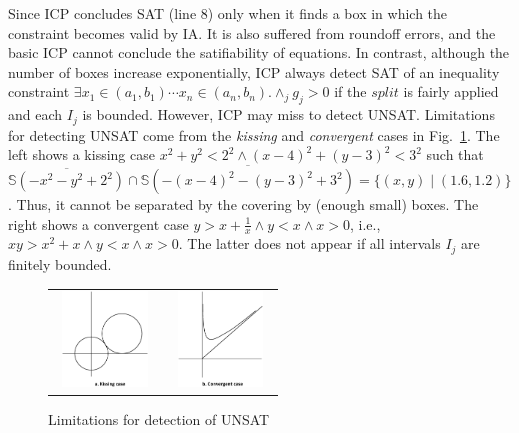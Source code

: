 \documentclass[runningheads,a4paper,oribibl]{llncs}
\begin{document}
Since ICP concludes SAT (line 8) only when it finds a box in which the constraint
becomes valid by IA. It is also suffered from roundoff errors, and 
the basic ICP cannot conclude the satifiability of equations. 
In contrast, although the number of boxes increase exponentially,
ICP always detect SAT of an inequality constraint 
$\exists x_1 \in (a_1,b_1) \cdots x_n \in (a_n,b_n) . \wedge_{j} g_j > 0$
if the $split$ is fairly applied and each $I_j$ is bounded. 
However, ICP may miss to detect UNSAT.
Limitations for detecting UNSAT come from the \emph{kissing} and \emph{convergent} cases
in Fig.~\ref{fig:limit}.  The left shows a kissing case 
$x^2 + y^2 < 2^2 \wedge (x-4)^2 + (y-3)^2 < 3^2$ such that 
$\overline{\mathbb{S}(- x^2 - y^2 + 2^2)} \cap
 \overline{\mathbb{S}(- (x-4)^2 - (y-3)^2 + 3^2)} = \{(x,y) \mid (1.6, 1.2)\}$. 
Thus, it cannot be separated by the covering by (enough small) boxes. 
The right shows a convergent case 
$y > x + \frac{1}{x} \wedge y < x \wedge x > 0$,
i.e., $xy > x^2 + x \wedge y < x \wedge x > 0$.
The latter does not appear if all intervals $I_j$ are finitely bounded. 
\begin{figure}[ht]
\centering
\begin{tabular}{cc}
\includegraphics[height=1in,width=1.05in]{kissing.eps} &
\includegraphics[height=1in,width=1.05in]{convergence.eps}
\end{tabular}
\caption{Limitations for detection of UNSAT} 
\label{fig:limit} 
\end{figure} 
\end{document}
